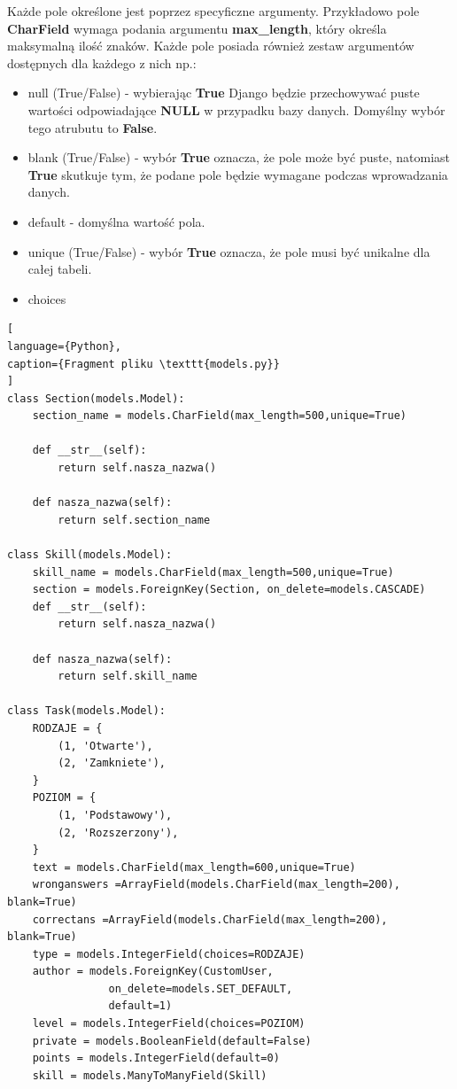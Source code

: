 \documentclass[oneside,polski,logo,indent]{amuthesis}
\begin{document}
\begin{enumerate}
\begin{enumerate}
Każde pole określone jest poprzez specyficzne argumenty. Przykładowo pole \textbf{CharField} wymaga podania argumentu \textbf{max\_length}, który określa maksymalną ilość znaków. Każde pole posiada również zestaw argumentów dostępnych dla każdego z nich np.:
\begin{itemize}
\item null (True/False) - wybierając \textbf{True} Django będzie przechowywać puste wartości odpowiadające \textbf{NULL} w przypadku bazy danych. Domyślny wybór tego atrubutu to \textbf{False}.
\item blank (True/False) - wybór \textbf{True} oznacza, że pole może być puste, natomiast \textbf{True} skutkuje tym, że podane pole będzie wymagane podczas wprowadzania danych.
\item default - domyślna wartość pola.
\item unique (True/False) - wybór \textbf{True} oznacza, że pole musi być unikalne dla całej tabeli.
\item choices
\end{itemize}

\begin{lstlisting}[
language={Python},
caption={Fragment pliku \texttt{models.py}}
]
class Section(models.Model):
    section_name = models.CharField(max_length=500,unique=True)

    def __str__(self):
        return self.nasza_nazwa()

    def nasza_nazwa(self):
        return self.section_name

class Skill(models.Model):
    skill_name = models.CharField(max_length=500,unique=True)
    section = models.ForeignKey(Section, on_delete=models.CASCADE)
    def __str__(self):
        return self.nasza_nazwa()

    def nasza_nazwa(self):
        return self.skill_name

class Task(models.Model):
    RODZAJE = {
        (1, 'Otwarte'),
        (2, 'Zamkniete'),
    }
    POZIOM = {
        (1, 'Podstawowy'),
        (2, 'Rozszerzony'),
    }
    text = models.CharField(max_length=600,unique=True)
    wronganswers =ArrayField(models.CharField(max_length=200), blank=True)
    correctans =ArrayField(models.CharField(max_length=200), blank=True)
    type = models.IntegerField(choices=RODZAJE)
    author = models.ForeignKey(CustomUser, 
				on_delete=models.SET_DEFAULT, 
				default=1)
    level = models.IntegerField(choices=POZIOM)
    private = models.BooleanField(default=False)
    points = models.IntegerField(default=0)
    skill = models.ManyToManyField(Skill)


\end{lstlisting}
\end{enumerate}
\end{enumerate}
\end{document}
